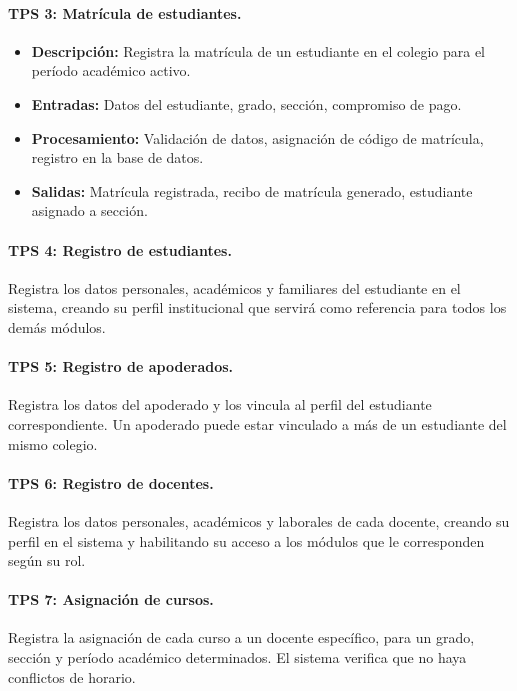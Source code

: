 \documentclass[12pt,a4paper,oneside]{report}
\begin{document}
\paragraph{TPS 3: Matrícula de estudiantes.}
\begin{itemize}
    \item \textbf{Descripción:} Registra la matrícula de un estudiante en el colegio para el período académico activo.
    \item \textbf{Entradas:} Datos del estudiante, grado, sección, compromiso de pago.
    \item \textbf{Procesamiento:} Validación de datos, asignación de código de matrícula, registro en la base de datos.
    \item \textbf{Salidas:} Matrícula registrada, recibo de matrícula generado, estudiante asignado a sección.
\end{itemize}

\paragraph{TPS 4: Registro de estudiantes.} Registra los datos personales, académicos y familiares del estudiante en el sistema, creando su perfil institucional que servirá como referencia para todos los demás módulos.

\paragraph{TPS 5: Registro de apoderados.} Registra los datos del apoderado y los vincula al perfil del estudiante correspondiente. Un apoderado puede estar vinculado a más de un estudiante del mismo colegio.

\paragraph{TPS 6: Registro de docentes.} Registra los datos personales, académicos y laborales de cada docente, creando su perfil en el sistema y habilitando su acceso a los módulos que le corresponden según su rol.

\paragraph{TPS 7: Asignación de cursos.} Registra la asignación de cada curso a un docente específico, para un grado, sección y período académico determinados. El sistema verifica que no haya conflictos de horario.
\end{document}
